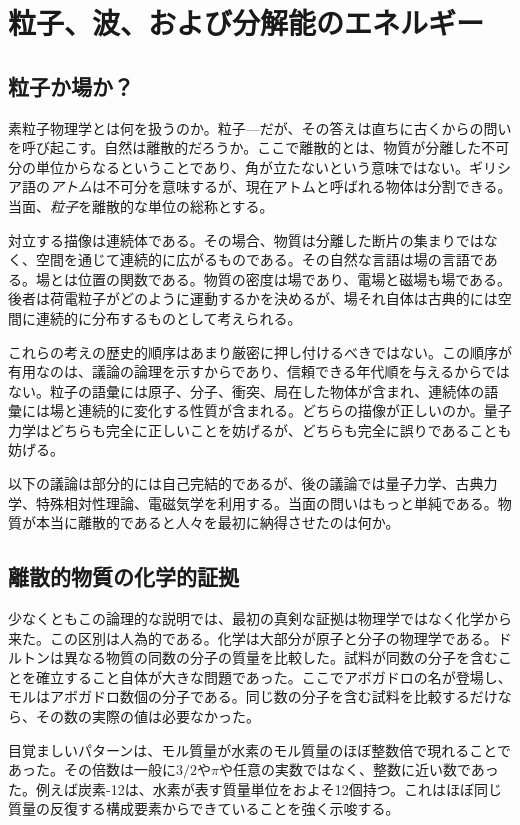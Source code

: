 \chapter{粒子、波、および分解能のエネルギー}

\section{粒子か場か？}

素粒子物理学とは何を扱うのか。粒子---だが、その答えは直ちに古くからの問いを呼び起こす。自然は離散的だろうか。ここで離散的とは、物質が分離した不可分の単位からなるということであり、角が立たないという意味ではない。ギリシア語の\emph{アトム}は不可分を意味するが、現在アトムと呼ばれる物体は分割できる。当面、\emph{粒子}を離散的な単位の総称とする。

対立する描像は連続体である。その場合、物質は分離した断片の集まりではなく、空間を通じて連続的に広がるものである。その自然な言語は場の言語である。場とは位置の関数である。物質の密度は場であり、電場と磁場も場である。後者は荷電粒子がどのように運動するかを決めるが、場それ自体は古典的には空間に連続的に分布するものとして考えられる。

これらの考えの歴史的順序はあまり厳密に押し付けるべきではない。この順序が有用なのは、議論の論理を示すからであり、信頼できる年代順を与えるからではない。粒子の語彙には原子、分子、衝突、局在した物体が含まれ、連続体の語彙には場と連続的に変化する性質が含まれる。どちらの描像が正しいのか。量子力学はどちらも完全に正しいことを妨げるが、どちらも完全に誤りであることも妨げる。

以下の議論は部分的には自己完結的であるが、後の議論では量子力学、古典力学、特殊相対性理論、電磁気学を利用する。当面の問いはもっと単純である。物質が本当に離散的であると人々を最初に納得させたのは何か。

\section{離散的物質の化学的証拠}

少なくともこの論理的な説明では、最初の真剣な証拠は物理学ではなく化学から来た。この区別は人為的である。化学は大部分が原子と分子の物理学である。ドルトンは異なる物質の同数の分子の質量を比較した。試料が同数の分子を含むことを確立すること自体が大きな問題であった。ここでアボガドロの名が登場し、モルはアボガドロ数個の分子である。同じ数の分子を含む試料を比較するだけなら、その数の実際の値は必要なかった。

目覚ましいパターンは、モル質量が水素のモル質量のほぼ整数倍で現れることであった。その倍数は一般に\(3/2\)や\(\pi\)や任意の実数ではなく、整数に近い数であった。例えば炭素-12は、水素が表す質量単位をおよそ12個持つ。これはほぼ同じ質量の反復する構成要素からできていることを強く示唆する。

